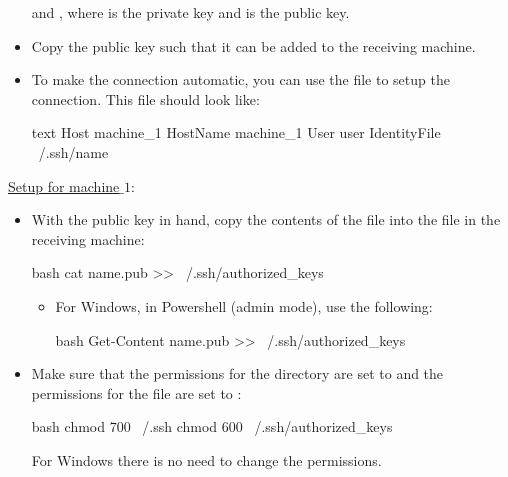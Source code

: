 \begin{itemize}
     and , where  is the private key
    and  is the public key.
    \item Copy the public key such that it can be added to the receiving
    machine.
    \item To make the connection automatic, you can use the file  to
    setup the connection. This file should look like:
    \begin{mintedbox}{text}
Host machine_1
    HostName machine_1
    User user
    IdentityFile ~/.ssh/name
    \end{mintedbox}
\end{itemize}

\underline{\underline{Setup for machine$\_1$}}:

\begin{itemize}
    \item With the public key in hand, copy the contents of the file into the
     file in the receiving machine:
    \begin{mintedbox}{bash}
cat name.pub >> ~/.ssh/authorized_keys
    \end{mintedbox}
    \begin{itemize}
        \item For Windows, in Powershell (admin mode), use the following:
        \begin{mintedbox}{bash}
Get-Content name.pub >> ~/.ssh/authorized_keys
        \end{mintedbox}
    \end{itemize}
    \item Make sure that the permissions for the  directory are set to
     and the permissions for the  file are
    set to :
    \begin{mintedbox}{bash}
chmod 700 ~/.ssh
chmod 600 ~/.ssh/authorized_keys
    \end{mintedbox}
    For Windows there is no need to change the permissions.
\end{itemize}
